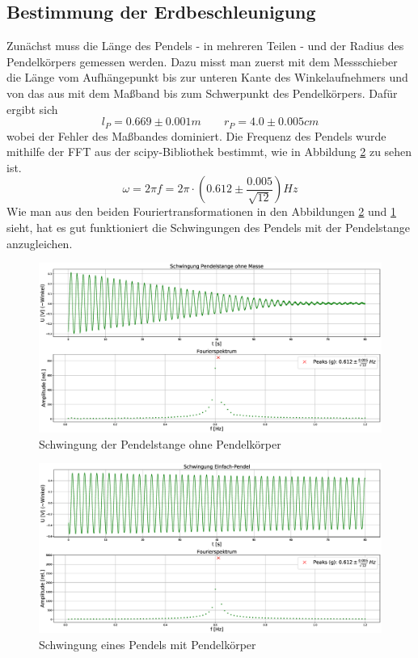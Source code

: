\documentclass[a4paper, 11pt]{article}
\begin{document}
\subsection{Bestimmung der Erdbeschleunigung}

Zunächst muss die Länge des Pendels - in mehreren Teilen - und der Radius des Pendelkörpers gemessen werden. Dazu misst man zuerst mit dem Messschieber die Länge vom Aufhängepunkt bis zur unteren Kante des Winkelaufnehmers und von das aus mit dem Maßband bis zum Schwerpunkt des Pendelkörpers. Dafür ergibt sich
\begin{equation*}
	l_P = 0.669 \pm 0.001 m \qquad r_P = 4.0 \pm 0.005 cm
\end{equation*}
wobei der Fehler des Maßbandes dominiert. Die Frequenz des Pendels wurde mithilfe der FFT aus der scipy-Bibliothek bestimmt, wie in Abbildung \ref{pic:Einfachpendel} zu sehen ist. 
\begin{equation*}
	\omega = 2\pi f = 2\pi \cdot \left( 0.612 \pm \frac{0.005}{\sqrt{12}} \right) Hz
\end{equation*}
Wie man aus den beiden Fouriertransformationen in den Abbildungen \ref{pic:Einfachpendel} und \ref{pic:Stange} sieht, hat es gut funktioniert die Schwingungen des Pendels mit der Pendelstange anzugleichen.

\begin{figure}[H]
	\centering
	\includegraphics[scale=0.3]{Plots/Stange.eps}
	\caption{Schwingung der Pendelstange ohne Pendelkörper}
	\label{pic:Stange}
\end{figure}
\begin{figure}[H]
	\centering
	\includegraphics[scale=0.3]{Plots/Einfachpendel.eps}
	\caption{Schwingung eines Pendels mit Pendelkörper}
	\label{pic:Einfachpendel}
\end{figure}
\end{document}

